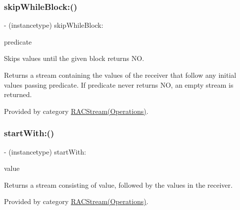 \mbox{\label{interface_r_a_c_stream_a1e323c308071aed5e01627d4d96ca9c8}} 
\subsubsection{\texorpdfstring{skip\+While\+Block\+:()}{skipWhileBlock:()}\hspace{0.1cm}{\footnotesize\ttfamily [3/3]}}
{\footnotesize\ttfamily -\/ (instancetype) skip\+While\+Block\+: \begin{DoxyParamCaption}\item[{(B\+O\+OL($^\wedge$)(id x))}]{predicate }\end{DoxyParamCaption}}

Skips values until the given block returns {\ttfamily NO}.

Returns a stream containing the values of the receiver that follow any initial values passing {\ttfamily predicate}. If {\ttfamily predicate} never returns {\ttfamily NO}, an empty stream is returned. 

Provided by category \mbox{\hyperlink{category_r_a_c_stream_07_operations_08_a1e323c308071aed5e01627d4d96ca9c8}{R\+A\+C\+Stream(\+Operations)}}.

\mbox{\label{interface_r_a_c_stream_a2f255fad695085b91a1ebc1e0a78c865}} 
\subsubsection{\texorpdfstring{start\+With\+:()}{startWith:()}\hspace{0.1cm}{\footnotesize\ttfamily [1/3]}}
{\footnotesize\ttfamily -\/ (instancetype) start\+With\+: \begin{DoxyParamCaption}\item[{(id)}]{value }\end{DoxyParamCaption}}

Returns a stream consisting of {\ttfamily value}, followed by the values in the receiver. 

Provided by category \mbox{\hyperlink{category_r_a_c_stream_07_operations_08_a2f255fad695085b91a1ebc1e0a78c865}{R\+A\+C\+Stream(\+Operations)}}.

